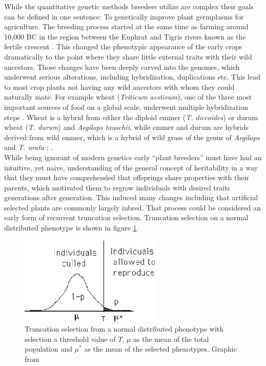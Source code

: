 While the quantitative genetic methods breeders utilize are complex their goals can be
defined in one sentence: To genetically improve plant germplasms for agriculture. The
breeding process started at the same time as farming around 10,000 BC in the region
between the Euphrat and Tigris rivers known as the fertile crescent
\cite{kingsbury2009hybrid}. This changed the phenotypic appearance of the early crops
dramatically to the point where they share little external traits with their wild
ancestors. Those changes have been deeply carved into the genomes, which underwent serious
alterations, including hybridization, duplications etc. This lead to most crop plants not
having any wild ancestors with whom they could naturally mate. For example wheat
(\textit{Triticum aestivum}), one of the three most important sources of food on a global
scale, underwent multiple hybridization steps \cite{ozkan2001allopolyploidy}. Wheat is a
hybrid from either the diploid emmer (\textit{T. diccoides}) or durum wheat
(\textit{T. durum}) and \textit{{Aegilops tauschii}}, while emmer and durum are hybrids
derived from wild emmer, which is a hybrid of wild grass of the genus of \textit{Aegilops}
and \textit{T. urata} \cite{friebe2000development}; \cite{feldman2012genome}.\\
While being ignorant of modern genetics early ``plant breeders'' must have had an
intuitive, yet naive, understanding of the general concept of heritability in a way that
they must have comprehended that offsprings share properties with their parents, which
motivated them to regrow individuals with desired traits generations after
generation. This induced many changes including that artificial selected plants are
commonly largely inbred. That process could be considered an early form of recurrent
truncation selection. Truncation selection on a normal distributed phenotype is shown in
figure \ref{fig:trunSel}.
 
\begin{figure}[H]
  \centering \includegraphics[height=.25\textheight, width=0.6\textwidth]{Figures/truncSel} \decoRule
  \caption[Truncation selection of a normal distributed phenotype]{Truncation selection
    from a normal distributed phenotype with selection a threshold value of $T$, $\mu$ as
    the mean of the total population and $\mu^{\ast}$ as the mean of the selected
    phenotypes. Graphic from \cite{walsh2018short}}
 \label{fig:trunSel}
\end{figure}

